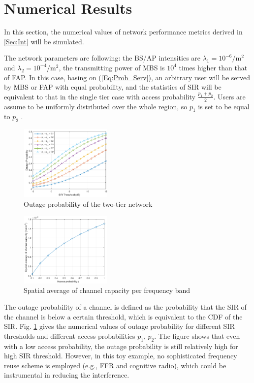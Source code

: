 \documentclass[a4paper,twocolumn]{IEEEtran}
\begin{document}
\section{Numerical Results}\label{Sec:Num}
In this section, the numerical values of network performance metrics derived in \ref{Sec:Int} will be simulated.

The network parameters are following: the BS/AP intensities are $\lambda_1 = 10^{-6} /\text{m}^2$ and $\lambda_2 = 10^{-4} /\text{m}^2$, the transmitting power of MBS is $10^4$ times higher than that of FAP. In this case, basing on (\ref{Eq:Prob_Serv}), an arbitrary user will be served by MBS or FAP with equal probability, and the statistics of SIR will be equivalent to that in the single tier case with access probability $\frac{p_1+p_2}{2}$. Users are assume to be uniformly distributed over the whole region, so $p_1$ is set to be equal to $p_2$  .

\begin{figure}[t]
	\centering
	\includegraphics[width = 0.4\textwidth]{figure/Outage_cropped}
	
	\caption{Outage probability of the two-tier network}
	\label{Fig:Outage}
\end{figure}

\begin{figure}[t]
	\centering
	\includegraphics[width = 0.4\textwidth]{figure/Capacity_cropped}
	
	\caption{Spatial average of channel capacity per frequency band}
	\label{Fig:Capacity}
\end{figure}

The outage probability of a channel is defined as the probability that the SIR of the channel is below a certain threshold, which is equivalent to the CDF of the SIR. Fig. \ref{Fig:Outage} gives the numerical values of outage probability for different SIR thresholds and different access probabilities $p_1$, $p_2$. The figure shows that even with a low access probability, the outage probability is still relatively high for high SIR threshold. However, in this toy example, no sophisticated frequency reuse scheme is employed (e.g., FFR and cognitive radio), which could be instrumental in reducing the interference.
\end{document}
